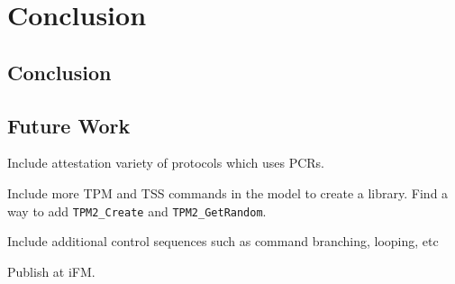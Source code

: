 \chapter{Conclusion}



\section{Conclusion}

\section{Future Work}
Include attestation variety of protocols which uses PCRs.

Include more TPM and TSS commands in the model to create a library. Find a way to add \verb|TPM2_Create| and \verb|TPM2_GetRandom|.

Include additional control sequences such as command branching, looping, etc

Publish at iFM.